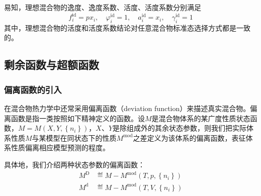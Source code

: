 \documentclass[main.tex]{subfiles}
\begin{document}
易知，理想混合物的逸度、逸度系数、活度、活度系数分别满足
\[f_i^\text{id}=px_i,\quad\varphi_i^\text{id}=1,\quad a_i^\text{id}=x_i,\quad\gamma_i^\text{id}=1\]
其中，理想混合物的活度和活度系数结论对任意混合物标准态选择方式都是一致的。






\subsection{剩余函数与超额函数}
\subsubsection{偏离函数的引入}
在混合物热力学中还常采用偏离函数（deviation function）来描述真实混合物。偏离函数是指一类按照如下精神定义的函数。设$M$是混合物体系的某广度性质状态函数，$M=M\left(X,Y,\left\{n_i\right\}\right)$，$X$、$Y$是除组成外的其余状态参数，则我们把实际体系性质$M$与某模型在同状态下的性质$M^\text{mod}$之差定义为该体系的偏离函数，表征体系性质偏离相应模型预测的程度。

具体地，我们介绍两种状态参数的偏离函数：
\begin{align}
    M^\text{D} & \eqdef M-M^\text{mod}\left(T,p,\left\{n_i\right\}\right)\label{eq:II.4_def_deviation_function_D} \\
    M^\text{d} & \eqdef M-M^\text{mod}\left(T,V,\left\{n_i\right\}\right)\label{eq:II.4_def_deviation_function_d}
\end{align}
\end{document}
